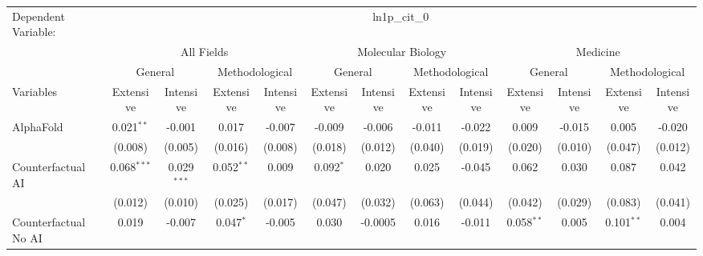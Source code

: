 \begingroup
\centering
\begin{tabular}{lcccccccccccc}
   \tabularnewline \midrule \midrule
   Dependent Variable: & \multicolumn{12}{c}{ln1p\_cit\_0}\\
 & \multicolumn{4}{c}{All Fields} & \multicolumn{4}{c}{Molecular Biology} & \multicolumn{4}{c}{Medicine} \\
\cmidrule(lr){2-5} \cmidrule(lr){6-9} \cmidrule(lr){10-13}
 & \multicolumn{2}{c}{General} & \multicolumn{2}{c}{Methodological} & \multicolumn{2}{c}{General} & \multicolumn{2}{c}{Methodological} & \multicolumn{2}{c}{General} & \multicolumn{2}{c}{Methodological} \\
\cmidrule(lr){2-3} \cmidrule(lr){4-5} \cmidrule(lr){6-7} \cmidrule(lr){8-9} \cmidrule(lr){10-11} \cmidrule(lr){12-13}
Variables & \multicolumn{1}{c}{Extensive} & \multicolumn{1}{c}{Intensive} & \multicolumn{1}{c}{Extensive} & \multicolumn{1}{c}{Intensive} & \multicolumn{1}{c}{Extensive} & \multicolumn{1}{c}{Intensive} & \multicolumn{1}{c}{Extensive} & \multicolumn{1}{c}{Intensive} & \multicolumn{1}{c}{Extensive} & \multicolumn{1}{c}{Intensive} & \multicolumn{1}{c}{Extensive} & \multicolumn{1}{c}{Intensive} \\
\cmidrule(lr){1-1}\cmidrule(lr){2-2} \cmidrule(lr){3-3} \cmidrule(lr){4-4} \cmidrule(lr){5-5} \cmidrule(lr){6-6} \cmidrule(lr){7-7} \cmidrule(lr){8-8} \cmidrule(lr){9-9} \cmidrule(lr){10-10} \cmidrule(lr){11-11} \cmidrule(lr){12-12} \cmidrule(lr){13-13}
   AlphaFold                                & 0.021$^{**}$  & -0.001        & 0.017        & -0.007  & -0.009        & -0.006        & -0.011  & -0.022  & 0.009        & -0.015       & 0.005        & -0.020\\   
                                            & (0.008)       & (0.005)       & (0.016)      & (0.008) & (0.018)       & (0.012)       & (0.040) & (0.019) & (0.020)      & (0.010)      & (0.047)      & (0.012)\\   
   Counterfactual AI                        & 0.068$^{***}$ & 0.029$^{***}$ & 0.052$^{**}$ & 0.009   & 0.092$^{*}$   & 0.020         & 0.025   & -0.045  & 0.062        & 0.030        & 0.087        & 0.042\\   
                                            & (0.012)       & (0.010)       & (0.025)      & (0.017) & (0.047)       & (0.032)       & (0.063) & (0.044) & (0.042)      & (0.029)      & (0.083)      & (0.041)\\   
   Counterfactual No AI                     & 0.019         & -0.007        & 0.047$^{*}$  & -0.005  & 0.030         & -0.0005       & 0.016   & -0.011  & 0.058$^{**}$ & 0.005        & 0.101$^{**}$ & 0.004\\   

\end{tabular}
